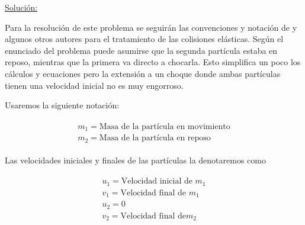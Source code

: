 \documentclass[a4paper,10pt]{article}
\begin{document}
\underline{Solución:}

\vspace{.3cm}



Para la resolución de este problema se seguirán las convenciones y notación de \cite{marion} y algunos
otros autores para el tratamiento de las colisiones elásticas. Según el enunciado del problema puede asumirse 
que la segunda partícula estaba en reposo, mientras que la primera va directo a chocarla. Esto simplifica 
un poco los cálculos y ecuaciones pero la extensión a un choque donde ambas partículas tienen una
velocidad inicial no es muy engorroso.

\vspace{.3cm}

Usaremos la siguiente notación:

 \begin{gather}
 \begin{split}
% 
  m_1 = \text{Masa de la partícula en movimiento} \\
  m_2 = \text{Masa de la partícula en reposo}
%  
  \label{eq:masas}
%  
 \end{split}
 \end{gather}

Las velocidades iniciales y finales de las partículas la denotaremos como

 \begin{gather}
 \begin{split}
%   
% 
  u_1 = \text{Velocidad inicial de } m_1 \\
  v_1 = \text{Velocidad final de } m_1 \\
%   
  u_2 = 0 \\
  v_2 = \textrm{Velocidad final de} m_2\\
 \label{eq:velMasas}
 \end{split}
 \end{gather}
\end{document}
